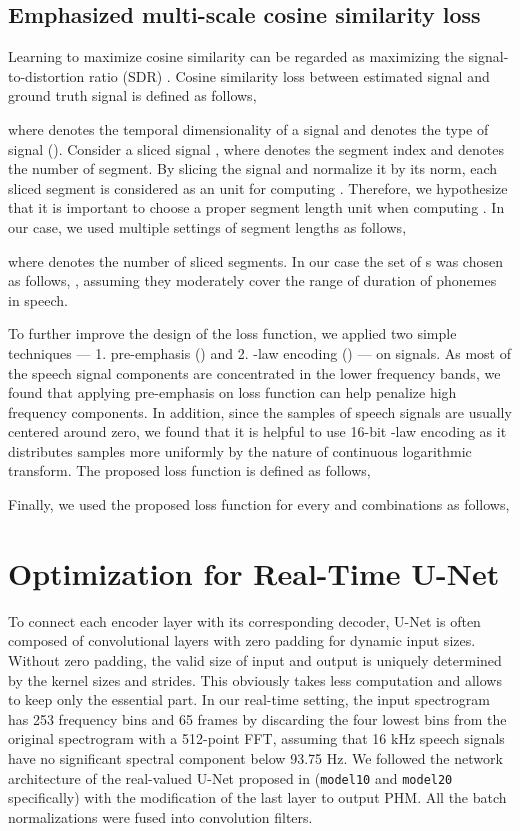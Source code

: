 \documentclass[a4paper]{article}
\begin{document}
\subsection{Emphasized multi-scale cosine similarity loss}
Learning to maximize cosine similarity can be regarded as maximizing the signal-to-distortion ratio (SDR) \cite{choi2019phase}. Cosine similarity loss  between estimated signal  and ground truth signal   is defined as follows,

where  denotes the temporal dimensionality of a signal and  denotes the type of signal ().
Consider a sliced signal , where  denotes the segment index and  denotes the number of segment.
By slicing the signal and normalize it by its norm, each sliced segment is considered as an unit for computing .
 Therefore, we hypothesize that it is important to choose a proper segment length unit  when computing .
 In our case, we used multiple settings of segment lengths  as follows,

where  denotes the number of sliced segments. 
In our case the set of \textquotesingle s was chosen as follows, , assuming they moderately cover the range of duration of phonemes in speech.

To further improve the design of the loss function, we applied two simple techniques --- 1. pre-emphasis () and 2. -law encoding () --- on signals. 
As most of the speech signal components are concentrated in the lower frequency bands, we found that applying pre-emphasis on loss function can help penalize high frequency components.
In addition, since the samples of speech signals are usually centered around zero, we found that it is helpful to use 16-bit -law encoding as it distributes samples more uniformly by the nature of continuous logarithmic transform.
The proposed loss function  is defined as follows,

Finally, we used the proposed loss function for every  and  combinations as follows, 


\section{Optimization for Real-Time U-Net}
\label{section:optimization}
To connect each encoder layer with its corresponding decoder, U-Net is often composed of convolutional layers with zero padding for dynamic input sizes. Without zero padding, the valid size of input and output is uniquely determined by the kernel sizes and strides. This obviously takes less computation and allows to keep only the essential part. In our real-time setting, the input spectrogram has 253 frequency bins and 65 frames by discarding the four lowest bins from the original spectrogram with a 512-point FFT, assuming that 16 kHz speech signals have no significant spectral component below 93.75 Hz. 
We followed the network architecture of the real-valued U-Net proposed in \cite{choi2019phase} (\texttt{model10} and \texttt{model20} specifically) with the modification of the last layer to output PHM. All the batch normalizations were fused into convolution filters.
\end{document}
